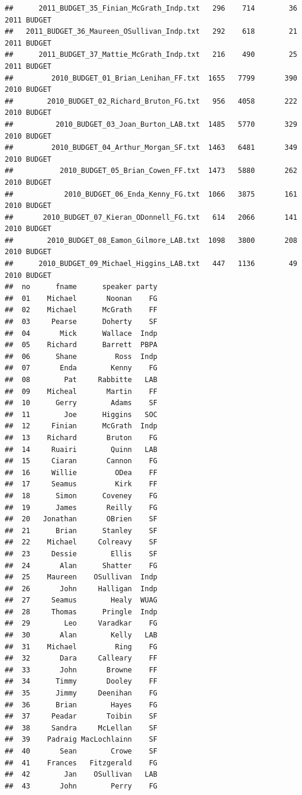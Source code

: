 \documentclass[11pt]{article}
\begin{document}
\begin{knitrout}
\begin{kframe}
\begin{verbatim}
##      2011_BUDGET_35_Finian_McGrath_Indp.txt   296    714        36 2011 BUDGET
##   2011_BUDGET_36_Maureen_OSullivan_Indp.txt   292    618        21 2011 BUDGET
##      2011_BUDGET_37_Mattie_McGrath_Indp.txt   216    490        25 2011 BUDGET
##         2010_BUDGET_01_Brian_Lenihan_FF.txt  1655   7799       390 2010 BUDGET
##        2010_BUDGET_02_Richard_Bruton_FG.txt   956   4058       222 2010 BUDGET
##          2010_BUDGET_03_Joan_Burton_LAB.txt  1485   5770       329 2010 BUDGET
##         2010_BUDGET_04_Arthur_Morgan_SF.txt  1463   6481       349 2010 BUDGET
##           2010_BUDGET_05_Brian_Cowen_FF.txt  1473   5880       262 2010 BUDGET
##            2010_BUDGET_06_Enda_Kenny_FG.txt  1066   3875       161 2010 BUDGET
##       2010_BUDGET_07_Kieran_ODonnell_FG.txt   614   2066       141 2010 BUDGET
##        2010_BUDGET_08_Eamon_Gilmore_LAB.txt  1098   3800       208 2010 BUDGET
##      2010_BUDGET_09_Michael_Higgins_LAB.txt   447   1136        49 2010 BUDGET
##  no      fname      speaker party
##  01    Michael       Noonan    FG
##  02    Michael      McGrath    FF
##  03     Pearse      Doherty    SF
##  04       Mick      Wallace  Indp
##  05    Richard      Barrett  PBPA
##  06      Shane         Ross  Indp
##  07       Enda        Kenny    FG
##  08        Pat     Rabbitte   LAB
##  09    Micheal       Martin    FF
##  10      Gerry        Adams    SF
##  11        Joe      Higgins   SOC
##  12     Finian      McGrath  Indp
##  13    Richard       Bruton    FG
##  14     Ruairi        Quinn   LAB
##  15     Ciaran       Cannon    FG
##  16     Willie         ODea    FF
##  17     Seamus         Kirk    FF
##  18      Simon      Coveney    FG
##  19      James       Reilly    FG
##  20   Jonathan       OBrien    SF
##  21      Brian      Stanley    SF
##  22    Michael     Colreavy    SF
##  23     Dessie        Ellis    SF
##  24       Alan      Shatter    FG
##  25    Maureen    OSullivan  Indp
##  26       John     Halligan  Indp
##  27     Seamus        Healy  WUAG
##  28     Thomas      Pringle  Indp
##  29        Leo     Varadkar    FG
##  30       Alan        Kelly   LAB
##  31    Michael         Ring    FG
##  32       Dara     Calleary    FF
##  33       John       Browne    FF
##  34      Timmy       Dooley    FF
##  35      Jimmy     Deenihan    FG
##  36      Brian        Hayes    FG
##  37     Peadar       Toibin    SF
##  38     Sandra     McLellan    SF
##  39    Padraig MacLochlainn    SF
##  40       Sean        Crowe    SF
##  41    Frances   Fitzgerald    FG
##  42        Jan    OSullivan   LAB
##  43       John        Perry    FG

\end{verbatim}
\end{kframe}
\end{knitrout}
\end{document}
